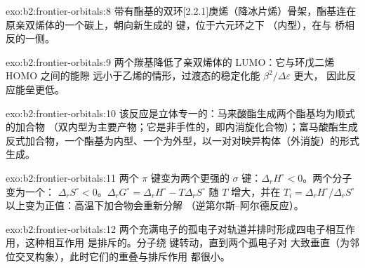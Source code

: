\begin{solution}{exo:b2:frontier-orbitals:8}
带有酯基的双环[2.2.1]庚烯（降冰片烯）骨架，酯基连在
原亲双烯体的一个碳上，朝向新生成的  键，位于六元环之下
（内型），在与  桥相反的一侧。
\end{solution}

\begin{solution}{exo:b2:frontier-orbitals:9}
两个羰基降低了亲双烯体的 LUMO：它与环戊二烯 HOMO 之间的能隙
远小于乙烯的情形，过渡态的稳定化能 $\beta^2/\Delta\varepsilon$ 更大，
因此反应能垒更低。
\end{solution}

\begin{solution}{exo:b2:frontier-orbitals:10}
该反应是立体专一的：马来酸酯生成两个酯基均为顺式的加合物
（双内型为主要产物；它是非手性的，即内消旋化合物）；富马酸酯生成
反式加合物，一个酯基为内型、一个为外型，以一对对映异构体（外消旋）的形式生成。
\end{solution}

\begin{solution}{exo:b2:frontier-orbitals:11}
两个 $\pi$ 键变为两个更强的 $\sigma$ 键：$\Delta_r H^\circ < 0$。两个分子变为一个：
$\Delta_r S^\circ < 0$。$\Delta_r G^\circ = \Delta_r H^\circ - T\Delta_r S^\circ$ 随 $T$ 增大，并在
$T_i = \Delta_r H^\circ/\Delta_r S^\circ$ 以上变为正值：高温下加合物会重新分解
（逆第尔斯–阿尔德反应）。
\end{solution}

\begin{solution}{exo:b2:frontier-orbitals:12}
两个充满电子的孤电子对轨道并排时形成四电子相互作用，这种相互作用
是排斥的。分子绕  键转动，直到两个孤电子对
大致垂直（为邻位交叉构象），此时它们的重叠与排斥作用
都很小。
\end{solution}


